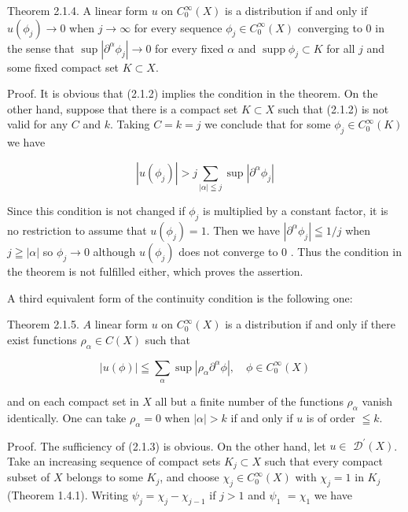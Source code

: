 Theorem 2.1.4. A linear form $u$ on $C_{0}^{\infty}(X)$ is a distribution if and only if $u\left(\phi_{j}\right) \rightarrow 0$ when $j \rightarrow \infty$ for every sequence $\phi_{j} \in C_{0}^{\infty}(X)$ converging to 0 in the sense that $\sup \left|\partial^{\alpha} \phi_{j}\right| \rightarrow 0$ for every fixed $\alpha$ and $\operatorname{supp} \phi_{j} \subset K$ for all $j$ and some fixed compact set $K \subset X$.

Proof. It is obvious that (2.1.2) implies the condition in the theorem. On the other hand, suppose that there is a compact set $K \subset X$ such that (2.1.2) is not valid for any $C$ and $k$. Taking $C=k=j$ we conclude that for some $\phi_{j} \in C_{0}^{\infty}(K)$ we have

\[
\left|u\left(\phi_{j}\right)\right|>j \sum_{|\alpha| \leqq j} \sup \left|\partial^{\alpha} \phi_{j}\right|
\]

Since this condition is not changed if $\phi_{j}$ is multiplied by a constant factor, it is no restriction to assume that $u\left(\phi_{j}\right)=1$. Then we have $\left|\partial^{\alpha} \phi_{j}\right| \leqq 1 / j$ when $j \geqq|\alpha|$ so $\phi_{j} \rightarrow 0$ although $u\left(\phi_{j}\right)$ does not converge to 0 . Thus the condition in the theorem is not fulfilled either, which proves the assertion.

A third equivalent form of the continuity condition is the following one:

Theorem 2.1.5. $A$ linear form $u$ on $C_{0}^{\infty}(X)$ is a distribution if and only if there exist functions $\rho_{\alpha} \in C(X)$ such that


\begin{equation*}
|u(\phi)| \leqq \sum_{\alpha} \sup \left|\rho_{\alpha} \partial^{\alpha} \phi\right|, \quad \phi \in C_{0}^{\infty}(X) \tag{2.1.3}
\end{equation*}


and on each compact set in $X$ all but a finite number of the functions $\rho_{\alpha}$ vanish identically. One can take $\rho_{\alpha}=0$ when $|\alpha|>k$ if and only if $u$ is of order $\leqq k$.

Proof. The sufficiency of (2.1.3) is obvious. On the other hand, let $u \in$ $\mathscr{D}^{\prime}(X)$. Take an increasing sequence of compact sets $K_{j} \subset X$ such that every compact subset of $X$ belongs to some $K_{j}$, and choose $\chi_{j} \in C_{0}^{\infty}(X)$ with $\chi_{j}=1$ in $K_{j}$ (Theorem 1.4.1). Writing $\psi_{j}=\chi_{j}-\chi_{j-1}$ if $j>1$ and $\psi_{1}$ $=\chi_{1}$ we have

